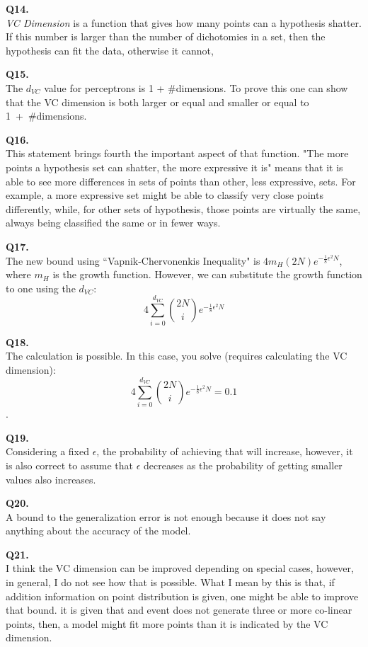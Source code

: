 \documentclass[]{article}
\begin{document}
	\noindent
	\textbf{Q14.}\\
	\textit{VC Dimension} is a function that gives how many points can a hypothesis shatter. If this number is larger than the number of dichotomies in a set, then the hypothesis can fit the data, otherwise it cannot,
	
	\noindent
	\textbf{Q15.}\\
	The $d_{VC}$ value for perceptrons is 1 + \#dimensions. To prove this one can show that the VC dimension is both larger or equal and smaller or equal to \mbox{1 + \#dimensions}.
	
	\noindent
	\textbf{Q16.}\\
	This statement brings fourth the important aspect of that function. "The more points a hypothesis set can shatter, the more expressive it is" means that it is able to see more differences in sets of points than other, less expressive, sets. For example, a more expressive set might be able to classify very close points differently, while, for other sets of hypothesis, those points are virtually the same, always being classified the same or in fewer ways.
	
	\noindent
	\textbf{Q17.}\\
	The new bound using ``Vapnik-Chervonenkis Inequality" is $4m_H(2N)e^{-\frac{1}{8}\epsilon^2N}$, where $m_H$ is the growth function. However, we can substitute the growth function to one using the $d_{VC}$: $${4\sum_{i=0}^{d_{VC}}\binom{2N}{i}e^{-\frac{1}{8}\epsilon^2N}}$$
	
	\newpage       
	\noindent
	\textbf{Q18.}\\
	The calculation is possible. In this case, you solve (requires calculating the VC dimension):\\
	$${4\sum_{i=0}^{d_{VC}}\binom{2N}{i}e^{-\frac{1}{8}\epsilon^2N}} = 0.1$$.
	
	\noindent
	\textbf{Q19.}\\
	Considering a fixed $\epsilon$, the probability of achieving that will increase, however, it is also correct to assume that $\epsilon$ decreases as the probability of getting smaller values also increases.
	
	\noindent
	\textbf{Q20.}\\
	A bound to the generalization error is not enough because it does not say anything about the accuracy of the model.
	
	\noindent
	\textbf{Q21.}\\
	I think the VC dimension can be improved depending on special cases, however, in general, I do not see how that is possible. What I mean by this is that, if addition information on point distribution is given, one might be able to improve that bound. it is given that and event does not generate three or more co-linear points, then, a model might fit more points than it is indicated by the VC dimension.
\end{document}
